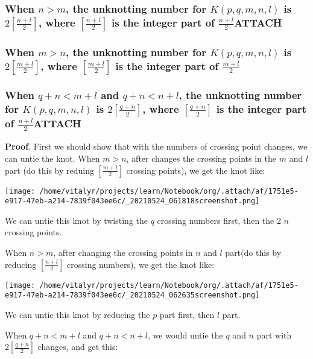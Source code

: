 \documentclass[a4paper]{article}
\begin{document}
\subsubsection{When \(n>m\), the unknotting number for \(K(p, q, m, n, l)\) is \(2[\frac{n+l}{2}]\), where \([\frac{n+l}{2}]\) is the integer part of \(\frac{n+l}{2}\)\hfill{}\textsc{ATTACH}}
\label{sec:org005be85}

\subsubsection{When \(m>n\), the unknotting number for \(K(p, q, m, n, l)\) is \(2[\frac{m+l}{2}]\), where \([\frac{m+l}{2}]\) is the integer part of \(\frac{m+l}{2}\)}
\label{sec:org4c039a6}
\subsubsection{When \(q + n < m + l\) and \(q + n < n + l\), the unknotting number for \(K(p, q, m, n, l)\) is \(2[\frac{q+n}{2}]\), where \([\frac{q+n}{2}]\) is the integer part of \(\frac{n+l}{2}\)\hfill{}\textsc{ATTACH}}
\label{sec:org0cd5f11}
\textbf{Proof}. First we should show that with the numbers of crossing point changes, we can untie the knot.
When \(m>n\), after changes the crossing points in the \(m\) and \(l\) part (do this by reduing \([\frac{m+l}{2}]\) crossing points), we get the knot like:

\begin{center}
\texttt{[image: /home/vitalyr/projects/learn/Notebook/org/.attach/af/1751e5-e917-47eb-a214-7839f043ee6c/\_20210524\_061818screenshot.png]}
\end{center}

We can untie this knot by twisting the \(q\) crossing numbers first, then the 2 \(n\) crossing points.

When \(n>m\), after changing the crossing points in \(n\) and \(l\) part(do this by reducing \([\frac{n+l}{2}]\) crossing numbers), we get the knot like:

\begin{center}
\texttt{[image: /home/vitalyr/projects/learn/Notebook/org/.attach/af/1751e5-e917-47eb-a214-7839f043ee6c/\_20210524\_062635screenshot.png]}
\end{center}

We can untie this knot by reducing the \(p\) part first, then \(l\) part.

When \(q + n < m + l\) and \(q + n < n + l\), we would untie the \(q\) and \(n\) part with \(2[\frac{q+n}{2}]\) changes, and get this:
\end{document}
